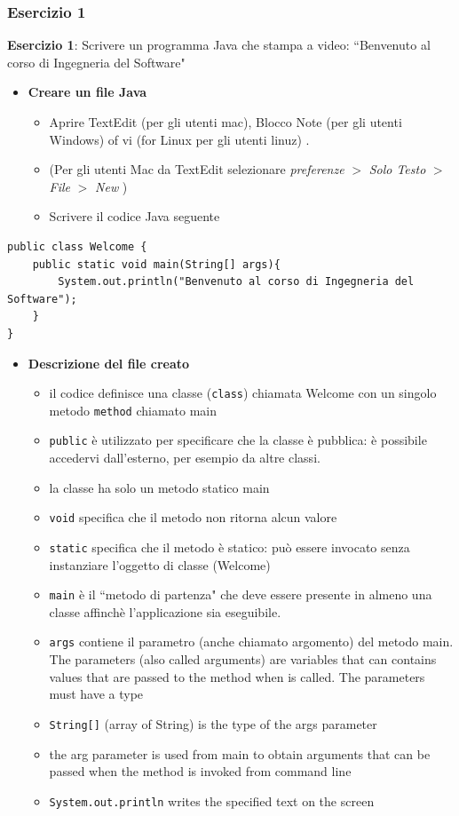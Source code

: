 \documentclass{article}
\theoremstyle{definition}
\begin{document}
\subsubsection{Esercizio 1}
\begin{framed}
\textbf{Esercizio 1}: Scrivere un programma Java che stampa a video: ``Benvenuto al corso di Ingegneria del Software"
\end{framed}

\begin{itemize}
\item \textbf{Creare un file Java}
\begin{itemize}
\item Aprire  TextEdit (per gli utenti mac), Blocco Note (per gli utenti Windows) of vi (for Linux per gli utenti linuz) .
\item (Per gli utenti Mac da TextEdit selezionare \textit{preferenze} $>$ \textit{Solo Testo} $>$ \textit{File} $>$ \textit{New} )
\item Scrivere il codice  Java seguente
\end{itemize}
\end{itemize}
\begin{lstlisting}
public class Welcome {	
    public static void main(String[] args){	
	 	System.out.println("Benvenuto al corso di Ingegneria del Software");
    }
}
\end{lstlisting}
\begin{itemize}
\item \textbf{Descrizione del file creato}
\begin{itemize}
\item il codice definisce una classe (\texttt{class}) chiamata  Welcome con un singolo metodo  \texttt{method} chiamato main
\item \texttt{public} \`e utilizzato per specificare che la classe \`e pubblica: \`e possibile accedervi dall'esterno, per esempio da altre classi.
\item la classe ha solo un metodo statico main
\item \texttt{void} specifica che il metodo non ritorna alcun valore
\item \texttt{static} specifica che il metodo \`e statico: pu\`o essere invocato senza instanziare l'oggetto di classe  (Welcome)
\item \texttt{main} \`e il ``metodo di partenza" che deve essere presente in almeno una classe affinch\`e l'applicazione sia eseguibile. 
\item \texttt{args} contiene il parametro (anche chiamato argomento) del metodo main.
 The parameters (also called arguments) are variables that can contains values that are passed to the method when is called. The parameters must have a type
\item \texttt{String[]} (array of String) is the type of the args parameter 
\item the arg parameter is used from main to obtain arguments that can be passed when the method is invoked from command line
\item \texttt{System.out.println} writes the specified text on the screen
\end{itemize}
\end{itemize}
\end{document}
